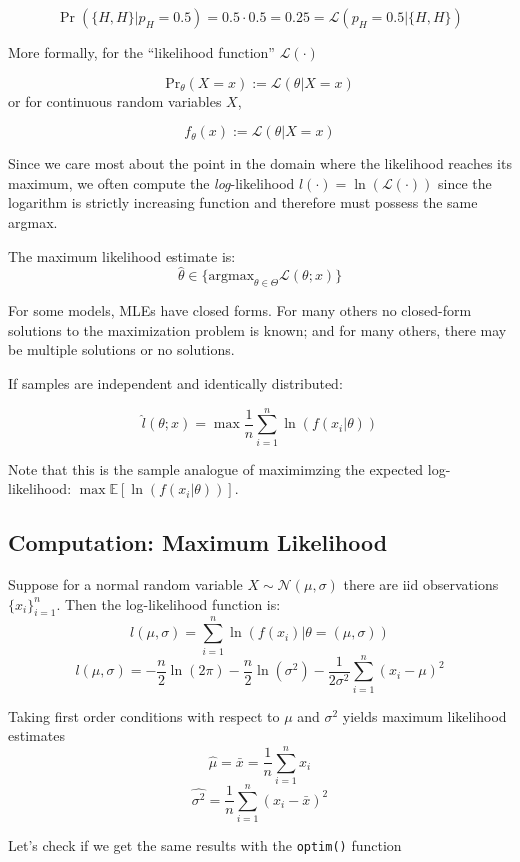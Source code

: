 \documentclass[11pt,]{article}
\begin{document}
\[\Pr(\{H,H\}|p_H = 0.5) = 0.5\cdot0.5=0.25= \mathcal{L}(p_H=0.5|\{H,H\})\]

More formally, for the ``likelihood function'' \(\mathcal{L}(\cdot)\)

\[\text{Pr}_{\theta}(X = x) := \mathcal{L}(\theta|X = x)\] or for
continuous random variables \(X\),

\[f_{\theta}(x) := \mathcal{L}(\theta|X=x)\]

Since we care most about the point in the domain where the likelihood
reaches its maximum, we often compute the \emph{log}-likelihood
\(l(\cdot)=\ln(\mathcal{L}(\cdot))\) since the logarithm is strictly
increasing function and therefore must possess the same argmax.

The maximum likelihood estimate is:
\[\hat{\theta}\in\{\text{argmax}_{\theta\in \Theta} \mathcal{L}(\theta; x)\}\]

For some models, MLEs have closed forms. For many others no closed-form
solutions to the maximization problem is known; and for many others,
there may be multiple solutions or no solutions.

If samples are independent and identically distributed:

\[\hat{l}(\theta; x) = \max{} \frac{1}{n}\sum_{i=1}^n \ln(f(x_i|\theta))\]

Note that this is the sample analogue of maximimzing the expected
log-likelihood: \(\max{} \mathbb{E}[\ln(f(x_i|\theta))]\).

\subsection{Computation: Maximum
Likelihood}\label{computation-maximum-likelihood}

Suppose for a normal random variable \(X\sim \mathcal{N}(\mu,\sigma)\)
there are iid observations \(\{x_i\}_{i=1}^n\). Then the log-likelihood
function is:
\[l(\mu, \sigma)=\sum_{i = 1}^n \ln(f(x_i)|\theta=(\mu, \sigma))\]
\[l(\mu, \sigma)=-\frac{n}{2}\ln(2\pi)-\frac{n}{2}\ln(\sigma^2)-
\frac{1}{2\sigma^2}\sum_{i=1}^n (x_i-\mu)^2\]

Taking first order conditions with respect to \(\mu\) and \(\sigma^2\)
yields maximum likelihood estimates
\[\hat{\mu} = \bar{x} = \frac{1}{n}\sum_{i=1}^n x_i\]
\[\widehat{\sigma^2} = \frac{1}{n}\sum_{i=1}^n (x_i-\bar{x})^2\]

Let's check if we get the same results with the \texttt{optim()}
function
\end{document}
